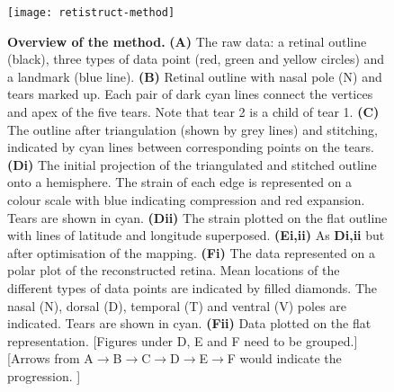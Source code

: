 \documentclass[10pt]{article}
\newcommand{\todo}[1]{{\color{red}[#1]}}
\begin{document}
\begin{figure}[!ht]
  \texttt{[image: retistruct-method]}
  
  \vspace*{-4.54in}

  \mbox{}

  \vspace*{2.27in}

  \caption{\textbf{Overview of the method.} \textbf{(A)} The raw data:
    a retinal outline (black), three types of data point (red, green
    and yellow circles) and a landmark (blue line). \textbf{(B)}
    Retinal outline with nasal pole (N) and tears marked up. Each pair
    of dark cyan lines connect the vertices and apex of the five
    tears. Note that tear 2 is a child of tear 1. \textbf{(C)} The
    outline after triangulation (shown by grey lines) and stitching,
    indicated by cyan lines between corresponding points on the tears.
    \textbf{(Di)} The initial projection of the triangulated and
    stitched outline onto a hemisphere. The strain of each edge is
    represented on a colour scale with blue indicating compression and
    red expansion. Tears are shown in cyan. \textbf{(Dii)} The strain
    plotted on the flat outline with lines of latitude and longitude
    superposed. \textbf{(Ei,ii)} As \textbf{Di,ii} but after
    optimisation of the mapping. \textbf{(Fi)} The data represented on
    a polar plot of the reconstructed retina. Mean locations of the
    different types of data points are indicated by filled
    diamonds. The nasal (N), dorsal (D), temporal (T) and ventral (V)
    poles are indicated. Tears are shown in cyan. \textbf{(Fii)} Data
    plotted on the flat representation.
    \todo{Figures under D, E and F need to be grouped.}
    \todo{Arrows from
      A$\rightarrow$B$\rightarrow$C$\rightarrow$D$\rightarrow$E$\rightarrow$F
      would indicate the progression. }}
  \label{fold-sphere:fig:method}
\end{figure}
\end{document}
